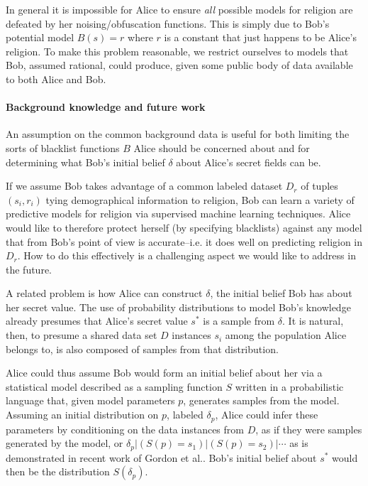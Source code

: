 \documentclass{article} %
\newcommand{\asecret}[0]{s}
\newcommand{\rsecret}[0]{\asecret^*}
\newcommand{\cond}[0]{|}
\theoremstyle{plain} %
\theoremstyle{definition} %
\begin{document}
In general it is impossible for Alice to ensure \emph{all} possible
models for religion are defeated by her noising/obfuscation
functions. This is simply due to Bob's potential model $ B(s) = r $
where $ r $ is a constant that just happens to be Alice's religion. To
make this problem reasonable, we restrict ourselves to models that
Bob, assumed rational, could produce, given some public body of data
available to both Alice and Bob.

\paragraph*{Background knowledge and future work} An assumption on the common
background data is useful for both limiting the sorts of blacklist
functions $ B $ Alice should be concerned about and for determining
what Bob's initial belief $ \delta $ about Alice's secret fields can
be.

If we assume Bob takes advantage of a common labeled dataset $ D_r $
of tuples $ (s_i, r_i) $ tying demographical information to religion,
Bob can learn a variety of predictive models for religion via
supervised machine learning techniques. Alice would like to therefore
protect herself (by specifying blacklists) against any model that from Bob's
point of view is accurate--i.e. it does well on predicting religion
in $ D_r $. How to do this effectively is a challenging aspect we
would like to address in the future.

A related problem is how Alice can construct $ \delta $, the initial
belief Bob has about her secret value. The use of probability
distributions to model Bob's knowledge already presumes that Alice's
secret value $ \rsecret $ is a sample from $ \delta $. It is natural,
then, to presume a shared data set $ D $ instances $ \asecret_i $ among the
population Alice belongs to, is also composed of samples from that
distribution.

Alice could thus assume Bob would form an initial belief about her via
a statistical model described as a sampling function $ S $ written in
a probabilistic language that, given model parameters $ p $, generates
samples from the model. Assuming an initial distribution on $ p $,
labeled $ \delta_p $, Alice could infer these parameters by
conditioning on the data instances from $ D $, as if they were samples
generated by the model, or $ \delta_p \cond (S(p) = \asecret_1) \cond
(S(p) = \asecret_2) \cond \cdots $ as is demonstrated in recent work
of Gordon et al.\cite{gordon13model}. Bob's initial belief about $
\rsecret $ would then be the distribution $ S(\delta_p) $.
\end{document}
